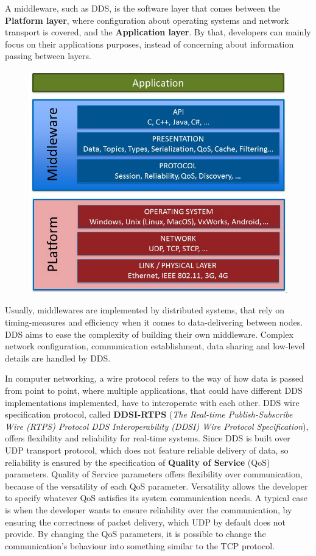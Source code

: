 A middleware, such as DDS, is the software layer that comes between the \textbf{Platform layer}, where configuration about operating systems and network transport is covered, and the \textbf{Application layer}. By that, developers can mainly focus on their applications purposes, instead of concerning about information passing between layers.

\begin{figure}[H]
        \centering
         \includegraphics[width=0.4\linewidth]{images/middleware.png}
\end{figure}

Usually, middlewares are implemented by distributed systems, that rely on timing-measures and efficiency when it comes to data-delivering between nodes. DDS aims to ease the complexity of building their own middleware. Complex network configuration, communication establishment, data sharing and low-level details are handled by DDS.

In computer networking, a wire protocol refers to the way of how data is passed from point to point, where multiple applications, that could have different DDS implementations implemented, have to interoperate with each other. DDS wire specification protocol, called \textbf{DDSI-RTPS} (\textit{The Real-time Publish-Subscribe Wire (RTPS) Protocol DDS Interoperability (DDSI) Wire Protocol Specification}), offers flexibility and reliability for real-time systems. Since DDS is built over UDP transport protocol, which does not feature reliable delivery of data, so reliability is ensured by the specification of \textbf{Quality of Service} (QoS) parameters. Quality of Service parameters offers flexibility over communication, because of the versatility of each QoS parameter. Versatility allows the developer to specify whatever QoS satisfies its system communication needs. A typical case is when the developer wants to ensure reliability over the communication, by ensuring the correctness of packet delivery, which UDP by default does not provide. By changing the QoS parameters, it is possible to change the communication's behaviour into something similar to the TCP protocol.  

